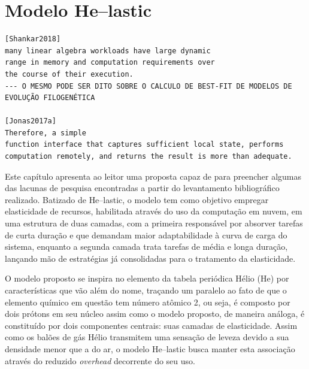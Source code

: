 \documentclass[english,brazilian]{UNISINOSmonografia} %
\begin{document}
\chapter{Modelo {H\lowercase{e}}--lastic }
\label{ch:modelo}




\begin{verbatim}
[Shankar2018]
many linear algebra workloads have large dynamic
range in memory and computation requirements over
the course of their execution.
--- O MESMO PODE SER DITO SOBRE O CALCULO DE BEST-FIT DE MODELOS DE EVOLUÇÃO FILOGENÉTICA

[Jonas2017a]
Therefore, a simple
function interface that captures sufficient local state, performs computation remotely, and returns the result is more than adequate.
\end{verbatim}





Este capítulo apresenta ao leitor uma proposta capaz de para preencher algumas das lacunas de pesquisa encontradas a partir do levantamento bibliográfico realizado.
Batizado de \textsf{He}--lastic, o modelo tem como objetivo empregar elasticidade de recursos, habilitada através do uso da computação em nuvem, em uma estrutura de duas camadas, com a primeira responsável por absorver tarefas de curta duração e que demandam maior adaptabilidade à curva de carga do sistema, enquanto a segunda camada trata tarefas de média e longa duração, lançando mão de estratégias já consolidadas para o tratamento da elasticidade.



O modelo proposto se inspira no elemento da tabela periódica Hélio (\textsf{He}) por características que vão além do nome, traçando um paralelo ao fato de que o elemento químico em questão tem número atômico 2, ou seja, é composto por dois prótons em seu núcleo assim como o modelo proposto, de maneira análoga, é constituído por dois componentes centrais: suas camadas de elasticidade.
Assim como os balões de gás Hélio transmitem uma sensação de leveza devido a sua densidade menor que a do ar, o modelo \textsf{He}--lastic busca manter esta associação através do reduzido \textit{overhead} decorrente do seu uso.
\end{document}
